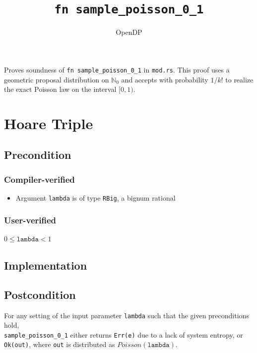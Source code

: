 \documentclass{article}
\title{\texttt{fn sample\_poisson\_0\_1}}
\author{OpenDP}
\begin{document}
\maketitle

\contrib Proves soundness of \texttt{fn sample\_poisson\_0\_1} in \texttt{mod.rs}.
This proof uses a geometric proposal distribution on $\mathbb{N}_0$ and accepts with
probability $1/k!$ to realize the exact Poisson law on the interval $[0,1)$.

\section{Hoare Triple}

\subsection*{Precondition}
\subsubsection*{Compiler-verified}
\begin{itemize}
    \item Argument \texttt{lambda} is of type \texttt{RBig}, a bignum rational
\end{itemize}

\subsubsection*{User-verified}
$0 \le \texttt{lambda} < 1$

\subsection*{Implementation}


\subsection*{Postcondition}
\begin{theorem}
\label{postcondition}
For any setting of the input parameter \texttt{lambda} such that the given preconditions hold, \\
\texttt{sample\_poisson\_0\_1} either returns \texttt{Err(e)} due to a lack of system entropy,
or \texttt{Ok(out)}, where \texttt{out} is distributed as $Poisson(\texttt{lambda})$.
\end{theorem}
\end{document}
